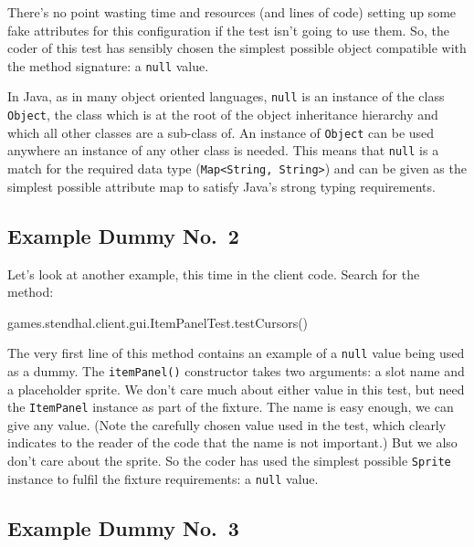 \documentclass[
]{book}
\newenvironment{Shaded}{\begin{snugshade}}{\end{snugshade}}
\newcommand{\FunctionTok}[1]{\textcolor[rgb]{0.00,0.00,0.00}{#1}}
\newcommand{\NormalTok}[1]{#1}
\begin{document}
There's no point wasting time and resources (and lines of code) setting up some fake attributes for this configuration if the test isn't going to use them. So, the coder of this test has sensibly chosen the simplest possible object compatible with the method signature: a \texttt{null} value.

In Java, as in many object oriented languages, \texttt{null} is an instance of the class \texttt{Object}, the class which is at the root of the object inheritance hierarchy and which all other classes are a sub-class of. An instance of \texttt{Object} can be used anywhere an instance of any other class is needed. This means that \texttt{null} is a match for the required data type (\texttt{Map\textless{}String,\ String\textgreater{}}) and can be given as the simplest possible attribute map to satisfy Java's strong typing requirements.

\hypertarget{dummy2}{%
\subsection{Example Dummy No.~2}\label{dummy2}}

Let's look at another example, this time in the client code. Search for the method:

\begin{Shaded}
\begin{Highlighting}[]
\NormalTok{games.}\FunctionTok{stendhal}\NormalTok{.}\FunctionTok{client}\NormalTok{.}\FunctionTok{gui}\NormalTok{.}\FunctionTok{ItemPanelTest}\NormalTok{.}\FunctionTok{testCursors}\NormalTok{()}
\end{Highlighting}
\end{Shaded}

The very first line of this method contains an example of a \texttt{null} value being used as a dummy. The \texttt{itemPanel()} constructor takes two arguments: a slot name and a placeholder sprite. We don't care much about either value in this test, but need the \texttt{ItemPanel} instance as part of the fixture. The name is easy enough, we can give any value. (Note the carefully chosen value used in the test, which clearly indicates to the reader of the code that the name is not important.) But we also don't care about the sprite. So the coder has used the simplest possible \texttt{Sprite} instance to fulfil the fixture requirements: a \texttt{null} value.

\hypertarget{dummy3}{%
\subsection{Example Dummy No.~3}\label{dummy3}}
\end{document}
